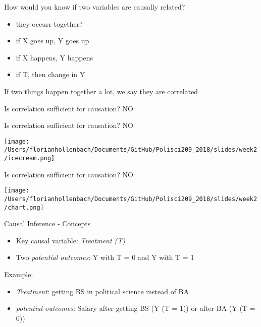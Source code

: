 \documentclass[presentation]{beamer}
\begin{document}
\begin{frame}[label={sec:org17b2fff}]{How would you know if two variables are causally related?}
\pause
\begin{itemize}
\item they occurr together?
\item if X goes up, Y goes up
\item if X happens, Y happens
\item if T, then change in Y
\end{itemize}


\pause
If two things happen together a lot, we say they are correlated
\end{frame}

\begin{frame}[label={sec:orgdb18d3f}]{Is correlation sufficient for causation?}
\pause
\LARGE{NO}
\end{frame}

\begin{frame}[label={sec:org8f0bd85}]{Is correlation sufficient for causation?}
\LARGE{NO}

\begin{center}
\texttt{[image: /Users/florianhollenbach/Documents/GitHub/Polisci209\_2018/slides/week2/icecream.png]}
\end{center}
\end{frame}


\begin{frame}[label={sec:org80803bd}]{Is correlation sufficient for causation?}
\LARGE{NO}

\begin{center}
\texttt{[image: /Users/florianhollenbach/Documents/GitHub/Polisci209\_2018/slides/week2/chart.png]}
\end{center}
\end{frame}



\begin{frame}[label={sec:org46b6dd2}]{Causal Inference - Concepts}
\begin{itemize}
\item Key causal variable: \emph{Treatment (T)}
\item Two \emph{potential outcomes}: Y with T = 0 and Y with T = 1
\end{itemize}

\pause
Example:
\begin{itemize}
\item \emph{Treatment}: getting BS in political science instead of BA
\item \emph{potential outcomes}: Salary after getting BS (Y (T = 1)) or after BA (Y (T = 0))
\end{itemize}
\end{frame}
\end{document}
